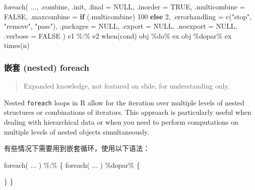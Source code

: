 \documentclass[
]{article}
\newenvironment{Shaded}{}{}
\newcommand{\AttributeTok}[1]{\textcolor[rgb]{0.49,0.56,0.16}{#1}}
\newcommand{\ConstantTok}[1]{\textcolor[rgb]{0.53,0.00,0.00}{#1}}
\newcommand{\ControlFlowTok}[1]{\textcolor[rgb]{0.00,0.44,0.13}{\textbf{#1}}}
\newcommand{\DecValTok}[1]{\textcolor[rgb]{0.25,0.63,0.44}{#1}}
\newcommand{\FunctionTok}[1]{\textcolor[rgb]{0.02,0.16,0.49}{#1}}
\newcommand{\NormalTok}[1]{#1}
\newcommand{\SpecialCharTok}[1]{\textcolor[rgb]{0.25,0.44,0.63}{#1}}
\newcommand{\StringTok}[1]{\textcolor[rgb]{0.25,0.44,0.63}{#1}}
\begin{document}
\begin{Shaded}
\begin{Highlighting}[]
\FunctionTok{foreach}\NormalTok{(}
\NormalTok{  ...,}
\NormalTok{  .combine,}
\NormalTok{  .init,}
  \AttributeTok{.final =} \ConstantTok{NULL}\NormalTok{,}
  \AttributeTok{.inorder =} \ConstantTok{TRUE}\NormalTok{,}
  \AttributeTok{.multicombine =} \ConstantTok{FALSE}\NormalTok{,}
  \AttributeTok{.maxcombine =} \ControlFlowTok{if}\NormalTok{ (.multicombine) }\DecValTok{100} \ControlFlowTok{else} \DecValTok{2}\NormalTok{,}
  \AttributeTok{.errorhandling =} \FunctionTok{c}\NormalTok{(}\StringTok{"stop"}\NormalTok{, }\StringTok{"remove"}\NormalTok{, }\StringTok{"pass"}\NormalTok{),}
  \AttributeTok{.packages =} \ConstantTok{NULL}\NormalTok{,}
  \AttributeTok{.export =} \ConstantTok{NULL}\NormalTok{,}
  \AttributeTok{.noexport =} \ConstantTok{NULL}\NormalTok{,}
  \AttributeTok{.verbose =} \ConstantTok{FALSE}
\NormalTok{)}
\NormalTok{e1 }\SpecialCharTok{\%:\%}\NormalTok{ e2}
\FunctionTok{when}\NormalTok{(cond)}
\NormalTok{obj }\SpecialCharTok{\%do\%}\NormalTok{ ex}
\NormalTok{obj }\SpecialCharTok{\%dopar\%}\NormalTok{ ex}
\FunctionTok{times}\NormalTok{(n)}
\end{Highlighting}
\end{Shaded}

\hypertarget{ux5d4cux5957-nested-foreach}{%
\subsubsection{\texorpdfstring{嵌套 (nested) foreach
}{嵌套 (nested) foreach }}\label{ux5d4cux5957-nested-foreach}}

\begin{quote}
Expanded knowledge, not featured on slide, for understanding only.
\end{quote}

Nested \texttt{foreach} loops in R allow for the iteration over multiple
levels of nested structures or combinations of iterators. This approach
is particularly useful when dealing with hierarchical data or when you
need to perform computations on multiple levels of nested objects
simultaneously.

有些情况下需要用到嵌套循环，使用以下语法：

\begin{Shaded}
\begin{Highlighting}[]
\FunctionTok{foreach}\NormalTok{( ... ) }\SpecialCharTok{\%:\%}\NormalTok{ \{}
  \FunctionTok{foreach}\NormalTok{( ... ) }\SpecialCharTok{\%dopar\%}\NormalTok{ \{}
    
\NormalTok{  \}}
\NormalTok{\}}
\end{Highlighting}
\end{Shaded}
\end{document}
